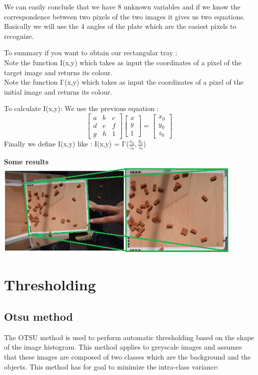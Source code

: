 \documentclass{article}
\begin{document}
We can easily conclude that we have 8 unknown variables and if we know the correspondence between two pixels of the two images it gives us two equations. Basically we will use the 4 angles of the plate which are the easiest pixels to recognize.

To summary if you want to obtain our rectangular tray :\\
Note the function I(x,y) which takes as input the coordinates of a pixel of the target image and returns its colour. \\
Note the function I\textquoteright(x,y) which takes as input the coordinates of a pixel of the initial image and returns its colour.
\vspace{ 1 cm}

To calculate I(x,y):
We use the previous equation :
$$\begin{bmatrix} a & b & c \\ d & e & f \\ g & h & 1 \end{bmatrix} \begin{bmatrix} x \\ y \\ 1 \end{bmatrix}  = \begin{bmatrix} x_0 \\ y_0 \\ z_0 \end{bmatrix}$$
Finally we define I(x,y) like : I(x,y) = I\textquoteright($\frac{x_0}{z_0}, \frac{y_0}{z_0}$)
\vspace{1 cm}

\textbf{Some results}\\
\includegraphics[width=12cm]{images/img21.png}


\section{Thresholding}

\subsection{Otsu method}
The OTSU method is used to perform automatic thresholding based on the shape of the image histogram.
This method applies to greyscale images and assumes that these images are composed of two classes which are the background and the objects.
This method has for goal to minimize the intra-class variance:\\
\\
\end{document}
